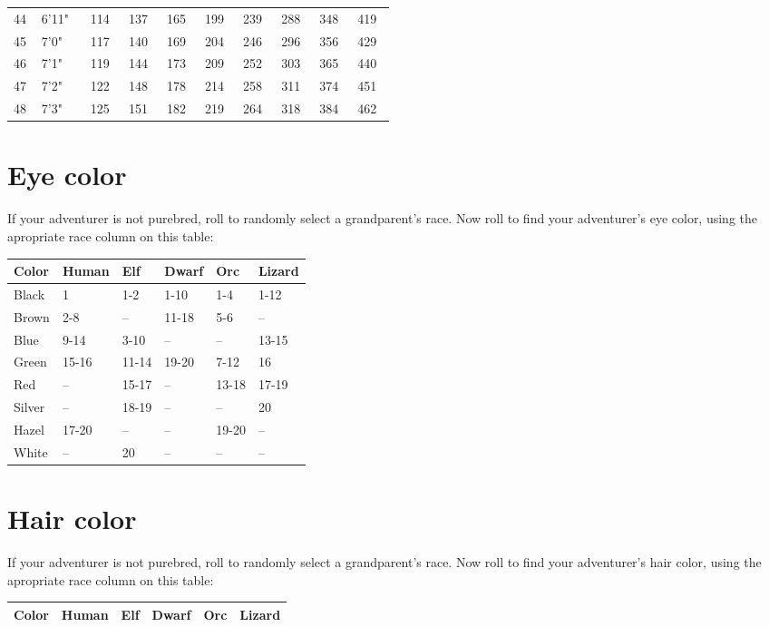 \begin{multicols*}{2}
\begin{tcolorbox}[breakable,boxrule=0pt,title=\textbf{Height and Weight Table}]
\begin{tabular}{@{} p{0.02\linewidth} p{0.07\linewidth} p{0.05\linewidth} p{0.05\linewidth} p{0.05\linewidth} p{0.05\linewidth} p{0.05\linewidth} p{0.05\linewidth} p{0.05\linewidth} p{0.05\linewidth} }
44 & 6'11" & 114 & 137 & 165 & 199 & 239 & 288 & 348 & 419\\
45 & 7'0" & 117 & 140 & 169 & 204 & 246 & 296 & 356 & 429\\
46 & 7'1" & 119 & 144 & 173 & 209 & 252 & 303 & 365 & 440\\
47 & 7'2" & 122 & 148 & 178 & 214 & 258 & 311 & 374 & 451\\
48 & 7'3" & 125 & 151 & 182 & 219 & 264 & 318 & 384 & 462\\
\end{tabular}
\end{tcolorbox}
\normalsize
\section{Eye color}
If your adventurer is not purebred, roll  to randomly select a grandparent's race. Now roll  to find your adventurer's eye color, using the apropriate race column on this table:

\begin{tcolorbox}[breakable,boxrule=0pt,after skip=0pt,before skip=5pt,title=\textbf{Eye Color}]
\begin{tabular}{l l l l l l}
Color & Human & Elf & Dwarf & Orc & Lizard\\
\midrule
Black & 1 & 1-2 & 1-10 & 1-4 & 1-12\\
Brown & 2-8 & -- & 11-18 & 5-6 & --\\
Blue & 9-14 & 3-10 & -- & -- & 13-15\\
Green & 15-16 & 11-14 & 19-20 & 7-12 & 16\\
Red & -- & 15-17 & -- & 13-18 & 17-19\\
Silver & -- & 18-19 & -- & -- & 20\\
Hazel & 17-20 & -- & -- & 19-20 & --\\
White & -- & 20 & -- & -- & --
\end{tabular}
\end{tcolorbox}
\section{Hair color}
If your adventurer is not purebred, roll  to randomly select a grandparent's race. Now roll  to find your adventurer's hair color, using the apropriate race column on this table:
\begin{tcolorbox}[breakable,boxrule=0pt,after skip=0pt,before skip=5pt,title=\textbf{Hair Color}]
\begin{tabular}{l l l l l l}
Color & Human & Elf & Dwarf & Orc & Lizard\\
\midrule


\end{tabular}
\end{tcolorbox}
\end{multicols*}
